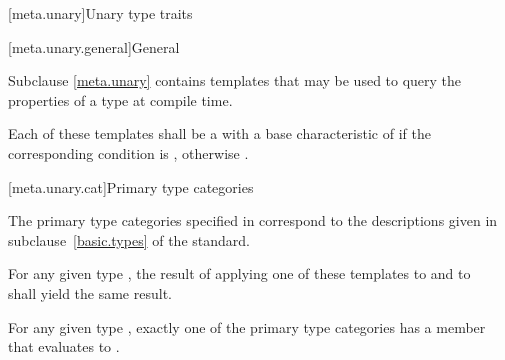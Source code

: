 [meta.unary]{Unary type traits}

[meta.unary.general]{General}

\pnum
Subclause \ref{meta.unary} contains templates that may be used to query the
properties of a type at compile time.

\pnum
Each of these templates shall be a
with a base characteristic of
 if the corresponding condition is , otherwise
.

[meta.unary.cat]{Primary type categories}

\pnum
The primary type categories specified in 
correspond to the descriptions given in
subclause~\ref{basic.types} of the \Cpp{} standard.

\pnum
For any given type , the result of applying one of these templates to
 and to \cv{}~ shall yield the same result.

\pnum
\begin{note}
For any given type , exactly one of the primary type categories
has a  member that evaluates to .
\end{note}


